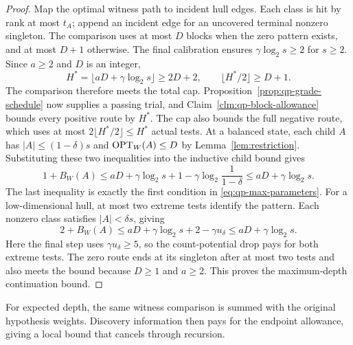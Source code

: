 \begin{proof}
Map the optimal witness path to incident hull edges. Each class is
hit by rank at most $t_A$; append an incident edge for an uncovered
terminal nonzero singleton. The comparison uses at most $D$ blocks
when the zero pattern exists, and at most $D+1$ otherwise. The final
calibration ensures $\gamma\log_2s\ge2$ for $s\ge2$.
Since $a\ge2$ and $D$ is an integer,
\[
 H^*=\lfloor aD+\gamma\log_2s\rfloor\ge2D+2,
 \qquad \lfloor H^*/2\rfloor\ge D+1.
\]
The comparison therefore meets the total cap.
Proposition~\ref{prop:qp-grade-schedule} now supplies a passing trial,
and Claim~\ref{clm:qp-block-allowance} bounds every positive route by $H^*$.
The cap also bounds the full negative route, which uses at most
$2\lfloor H^*/2\rfloor\le H^*$ actual tests.
At a balanced state, each child $A$ has
$|A|\le(1-\delta)s$ and $\operatorname{OPT}_W(A)\le D$ by
Lemma~\ref{lem:restriction}. Substituting these two inequalities into
the inductive child bound gives
\[
 1+B_W(A)
 \le aD+\gamma\log_2s
           +1-\gamma\log_2\frac1{1-\delta}
 \le aD+\gamma\log_2s.
\]
The last inequality is exactly the first condition in
\eqref{eq:qp-max-parameters}. For a low-dimensional hull, at most
two extreme tests identify the pattern. Each nonzero class
satisfies $|A|<\delta s$, giving
\[
 2+B_W(A)\le aD+\gamma\log_2s+2-\gamma u_\delta
             \le aD+\gamma\log_2s.
\]
Here the final step uses $\gamma u_\delta\ge5$, so the count-potential
drop pays for both extreme tests.
The zero route ends at its singleton after at most two tests and
also meets the bound because $D\ge1$ and $a\ge2$.
This proves the maximum-depth continuation bound.
\end{proof}

For expected depth, the same witness comparison is summed with the
original hypothesis weights. Discovery information then pays for the
endpoint allowance, giving a local bound that cancels through recursion.

